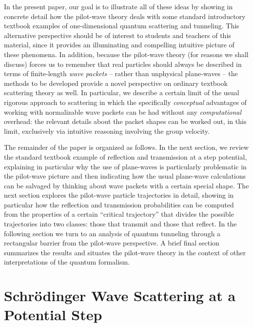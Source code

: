 \documentclass[aps,prc,onecolumn,letterpaper,floatfix,12pt]{revtex4}
\begin{document}
In the present paper, our goal is to illustrate all of these ideas by
showing in concrete detail how the pilot-wave theory deals with some
standard introductory textbook examples of one-dimensional quantum
scattering and tunneling.  This alternative perspective should be of
interest to students and teachers of this material, since it provides
an illuminating and compelling intuitive picture of these phenomena.
In addition, because the pilot-wave theory (for reasons we shall
discuss) forces us to remember that real particles should always
be described in terms of finite-length \emph{wave packets} -- rather
than unphysical plane-waves -- the methods to be developed provide a
novel perspective on ordinary textbook scattering theory as well.  In
particular, we describe a certain limit of the usual rigorous
approach to scattering \cite{scattering} in
which the specifically \emph{conceptual} advantages of working with
normalizable wave packets can be had without any \emph{computational}
overhead:  the relevant details about the packet shapes can be worked
out, in this limit, exclusively via intuitive reasoning involving the group velocity.




The remainder of the paper is organized as follows.  In the next
section, we review the standard textbook example of reflection and
transmission at a step potential, explaining in particular why the use
of plane-waves is particularly problematic in the pilot-wave picture
and then indicating how the usual plane-wave calculations can
be salvaged by thinking about wave packets with a certain special shape.
The
next section explores the pilot-wave particle trajectories in detail,
showing in particular how the reflection and transmission
probabilities can be computed from the properties of a certain
``critical trajectory'' \cite{uu} that divides the possible trajectories into
two classes:  those that transmit and those that reflect.  In the
following section we turn to an analysis of quantum tunneling through
a rectangular barrier from the pilot-wave perspective.  
A brief final section summarizes the results and situates the
pilot-wave theory in the context of other interpretations of the
quantum formalism.




\section{Schr\"odinger Wave Scattering at a Potential Step}
\end{document}
